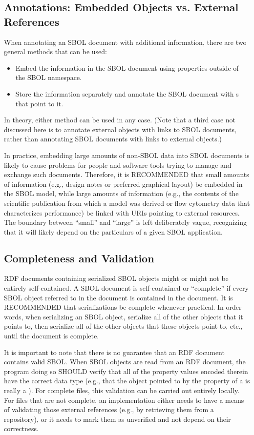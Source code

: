 \subsection{Annotations: Embedded Objects vs. External References}

When annotating an SBOL document with additional information, there are
two general methods that can be used:
\begin{itemize}
\item Embed the information in the SBOL document using properties outside of the SBOL namespace.
\item Store the information separately and annotate the SBOL document with s that point to it.
\end{itemize}
In theory, either method can be used in any case. (Note that a third case not
discussed here is to annotate external objects with links
to SBOL documents, rather than annotating SBOL documents with links to external objects.)

In practice, 
embedding large amounts of non-SBOL data into SBOL documents is likely
to cause problems for people and software tools trying to manage and
exchange such documents.  Therefore, it is RECOMMENDED that small amounts of information (e.g., design notes or preferred graphical layout) be embedded in the SBOL model, while large amounts of information (e.g., the contents of the scientific publication from which a model was derived or flow cytometry data that characterizes performance) be linked with URIs pointing to external resources.  The boundary between ``small'' and ``large'' is left deliberately vague, recognizing that it will likely depend on the particulars of a given SBOL application.

\subsection{Completeness and Validation}

RDF documents containing serialized SBOL objects might or might not be
entirely self-contained.  A SBOL document is self-contained or ``complete'' if every SBOL object referred to in the document is contained in the document.  It is RECOMMENDED that serializations be complete whenever practical.  In order words, when serializing an SBOL object, serialize all of the other objects that it points to, then serialize all of the other objects that these objects point to, etc., until the document is complete.

It is important to note that there is no guarantee that an RDF document
contains valid SBOL. When SBOL objects are read from an RDF document,
 the program doing so SHOULD verify that all of the property
values encoded therein have the correct data type (e.g., that the object
pointed to by the  property of a
 is really a ).
For complete files, this validation can be carried out entirely locally. For files that are not complete, an implementation either needs to have a means of validating those external references (e.g., by
retrieving them from a repository), or it needs to mark them as
unverified and not depend on their correctness.

